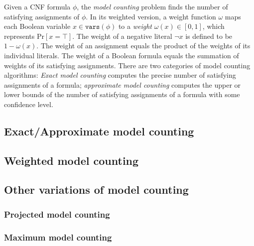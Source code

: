 Given a CNF formula $\phi$, the \textit{model counting} problem finds the number of satisfying assignments of $\phi$.
In its weighted version, a weight function $\omega$ maps each Boolean variable $x \in \mathtt{vars}(\phi)$ to a \textit{weight} $\omega(x) \in [0,1]$, which represents $\mathrm{Pr}[x=\top]$.
The weight of a negative literal $\neg x$ is defined to be $1-\omega(x)$.
The weight of an assignment equals the product of the weights of its individual literals.
The weight of a Boolean formula equals the summation of weights of its satisfying assignments.
There are two categories of model counting algorithms: \textit{Exact model counting} computes the precise number of satisfying assignments of a formula; \textit{approximate model counting} computes the upper or lower bounds of the number of satisfying assignments of a formula with some confidence level.
\iffalse
    \begin{example}
        Consider the same matrix $\phi$ as in Example~\ref{ex:assign}.
        Given a weight function where $\omega(x_1) = 0.2$, $\omega(x_2) = 0.3$, $\omega(x_3) = 0.5$. The SAT mintern $x_1x_2\neg x_3$ has weight of $0.03$ and the UNSAT cube $\neg x_1$ has weight of $0.2$. Total weight of $\phi$ is sum of the weight of two satisfying assignments: $\tau_1 = x_1x_2$, $\tau_2 = x_1x_3$, which is $0.16$.
    \end{example}
\fi

\subsection{Exact/Approximate model counting}
\subsection{Weighted model counting}
\subsection{Other variations of model counting}
\subsubsection{Projected model counting}
\subsubsection{Maximum model counting}